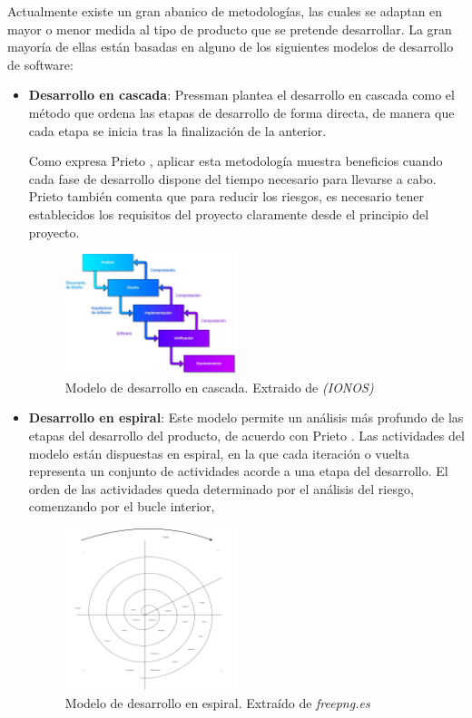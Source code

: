 Actualmente existe un gran abanico de metodologías, las cuales se adaptan en mayor o menor medida al tipo de producto 
que se pretende desarrollar. La gran mayoría de ellas están basadas en alguno de los siguientes modelos de desarrollo 
de software:
\begin{itemize}

    \item \textbf{Desarrollo en cascada}: Pressman \autocite*{Pressman1988} plantea el desarrollo en cascada como el 
    método que ordena las etapas de desarrollo de forma directa, de manera que cada etapa se inicia tras la finalización 
    de la anterior.
    
    Como expresa Prieto \autocite*{PrietoAlvarez2013}, aplicar esta metodología muestra beneficios cuando cada fase de desarrollo 
    dispone del tiempo necesario para llevarse a cabo. Prieto también comenta que para reducir los riesgos, es necesario tener 
    establecidos los requisitos del proyecto claramente desde el principio del proyecto.

    \begin{figure}[H]
        \centering
        \includegraphics[width=5cm]{Figures/modelo_cascada.jpg}
        \caption{Modelo de desarrollo en cascada. Extraido de \textit{(IONOS)}\autocite*{DigitalGuideIONOS2019}}
    \end{figure}

    \item \textbf{Desarrollo en espiral}: Este modelo permite un análisis más profundo de las etapas del desarrollo del 
    producto, de acuerdo con Prieto \autocite*{PrietoAlvarez2013}. Las actividades del modelo están dispuestas en espiral, en la que cada iteración o vuelta representa 
    un conjunto de actividades acorde a una etapa del desarrollo. El orden de las actividades queda determinado por el 
    análisis del riesgo, comenzando por el bucle interior, \medskip 


    \begin{figure}[H]
        \centering
        \includegraphics[width=5cm]{Figures/SVG/espiral.png}
        \caption{Modelo de desarrollo en espiral. Extraído de \textit{freepng.es} \autocite*{Espiral}}
    \end{figure}


\end{itemize}
